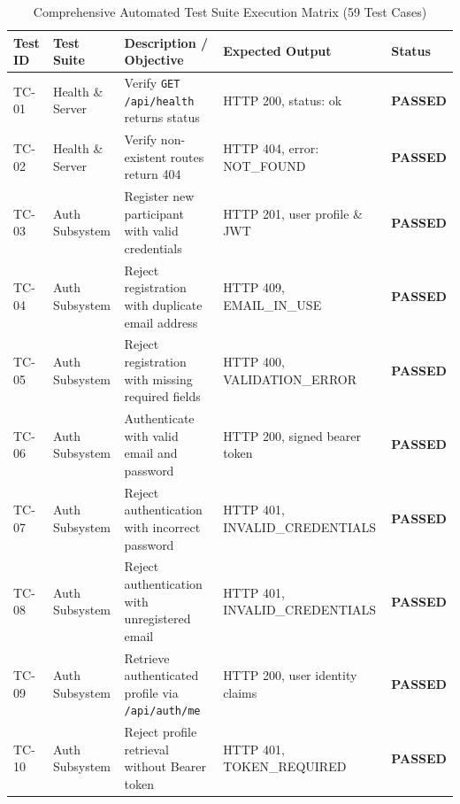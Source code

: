 \documentclass[11pt,a4paper]{report}
\begin{document}
\begin{table}[H]
\centering
\fontsize{7.5}{9.5}\selectfont
\renewcommand{\arraystretch}{1.2}
\setlength{\tabcolsep}{3pt}
\caption{Comprehensive Automated Test Suite Execution Matrix (59 Test Cases)}
\label{tab:test_suite_matrix}
\begin{tabularx}{\textwidth}{|p{}|p{}|p{}|p{}|X|}
\hline
\rowcolor{TCSBlue}
\color{white}\bfseries Test ID & 
\color{white}\bfseries Test Suite & 
\color{white}\bfseries Description / Objective & 
\color{white}\bfseries Expected Output & 
\color{white}\bfseries Status \\\hline

TC-01 & Health \& Server & Verify \texttt{GET /api/health} returns status & HTTP 200, status: ok & \color{SuccessGreen}\textbf{PASSED} \\\hline
TC-02 & Health \& Server & Verify non-existent routes return 404 & HTTP 404, error: NOT\_FOUND & \color{SuccessGreen}\textbf{PASSED} \\\hline
TC-03 & Auth Subsystem & Register new participant with valid credentials & HTTP 201, user profile \& JWT & \color{SuccessGreen}\textbf{PASSED} \\\hline
TC-04 & Auth Subsystem & Reject registration with duplicate email address & HTTP 409, EMAIL\_IN\_USE & \color{SuccessGreen}\textbf{PASSED} \\\hline
TC-05 & Auth Subsystem & Reject registration with missing required fields & HTTP 400, VALIDATION\_ERROR & \color{SuccessGreen}\textbf{PASSED} \\\hline
TC-06 & Auth Subsystem & Authenticate with valid email and password & HTTP 200, signed bearer token & \color{SuccessGreen}\textbf{PASSED} \\\hline
TC-07 & Auth Subsystem & Reject authentication with incorrect password & HTTP 401, INVALID\_CREDENTIALS & \color{SuccessGreen}\textbf{PASSED} \\\hline
TC-08 & Auth Subsystem & Reject authentication with unregistered email & HTTP 401, INVALID\_CREDENTIALS & \color{SuccessGreen}\textbf{PASSED} \\\hline
TC-09 & Auth Subsystem & Retrieve authenticated profile via \texttt{/api/auth/me} & HTTP 200, user identity claims & \color{SuccessGreen}\textbf{PASSED} \\\hline
TC-10 & Auth Subsystem & Reject profile retrieval without Bearer token & HTTP 401, TOKEN\_REQUIRED & \color{SuccessGreen}\textbf{PASSED} \\\hline

\end{tabularx}
\end{table}
\end{document}

